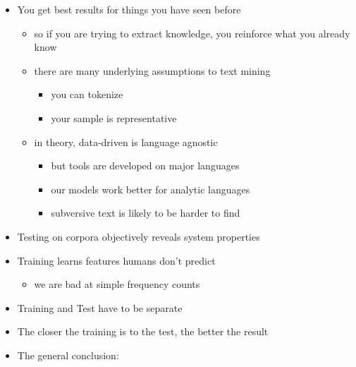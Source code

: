 \documentclass[a4paper,landscape,headrule,footrule,dvips]{foils}
\begin{document}
\begin{CJK}{UTF8}{min}

\begin{itemize}
\item You get best results for things you have seen before
  \begin{itemize}
  \item so if you are trying to extract knowledge, you reinforce what
    you already know
  \item there are many underlying assumptions to text mining
    \begin{itemize}
    \item you can tokenize
    \item your sample is representative
    \end{itemize}
  \item in theory, data-driven is language agnostic
    \begin{itemize}
    \item but tools are developed on major languages
    \item our models work better for analytic languages
    \item subversive text is likely to be harder to find
    \end{itemize}

  \end{itemize}
\end{itemize}



\begin{itemize}
\item Testing on corpora objectively reveals system properties
\item Training learns features humans don't predict
  \begin{itemize}
  \item we are bad at simple frequency counts
  \end{itemize}
\item Training and Test have to be separate
\item The closer the training is to the test, the better the result
\item The general conclusion: 
\end{itemize}


\clearpage
\end{CJK}
\end{document}
